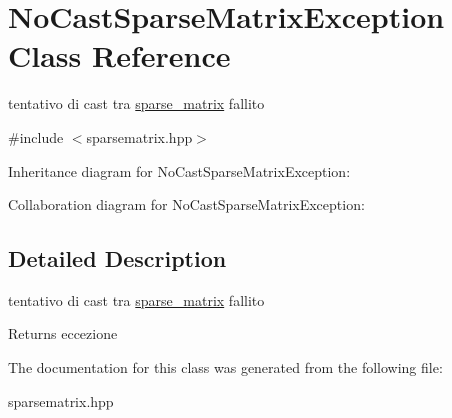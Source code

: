 \hypertarget{classNoCastSparseMatrixException}{}\section{No\+Cast\+Sparse\+Matrix\+Exception Class Reference}
\label{classNoCastSparseMatrixException}


tentativo di cast tra \hyperlink{classsparse__matrix}{sparse\+\_\+matrix} fallito  




{\ttfamily \#include $<$sparsematrix.\+hpp$>$}



Inheritance diagram for No\+Cast\+Sparse\+Matrix\+Exception\+:


Collaboration diagram for No\+Cast\+Sparse\+Matrix\+Exception\+:


\subsection{Detailed Description}
tentativo di cast tra \hyperlink{classsparse__matrix}{sparse\+\_\+matrix} fallito 

\begin{DoxyReturn}{Returns}
eccezione 
\end{DoxyReturn}


The documentation for this class was generated from the following file\+:\begin{DoxyCompactItemize}
\item 
sparsematrix.\+hpp\end{DoxyCompactItemize}
